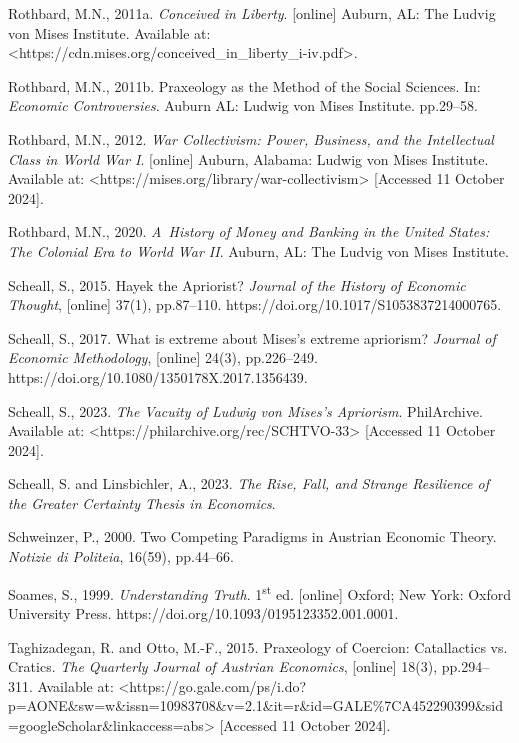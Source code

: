 Rothbard, M.N., 2011a. \textit{Conceived in Liberty}. [online] Auburn, AL: The Ludvig von Mises Institute. Available at: {\textless}https://cdn.mises.org/conceived\_in\_liberty\_i-iv.pdf{\textgreater}.



Rothbard, M.N., 2011b. Praxeology as the Method of the Social Sciences. In: \textit{Economic Controversies}. Auburn AL: Ludwig von Mises Institute. pp.29–58.



Rothbard, M.N., 2012. \textit{War Collectivism: Power, Business, and the Intellectual Class in World War I}. [online] Auburn, Alabama: Ludwig von Mises Institute. Available at: {\textless}https://mises.org/library/war-collectivism{\textgreater} [Accessed 11 October 2024].



Rothbard, M.N., 2020. \textit{A~History of Money and Banking in the United States: The Colonial Era to World War II}. Auburn, AL: The Ludvig von Mises Institute.



Scheall, S., 2015. Hayek the Apriorist? \textit{Journal of the History of Economic Thought}, [online] 37(1), pp.87–110. https://doi.org/10.1017/S1053837214000765.



Scheall, S., 2017. What is extreme about Mises's extreme apriorism? \textit{Journal of Economic Methodology}, [online] 24(3), pp.226–249. https://doi.org/10.1080/1350178X.2017.1356439.



Scheall, S., 2023. \textit{The Vacuity of Ludwig von Mises's Apriorism}. PhilArchive. Available at: {\textless}https://philarchive.org/rec/SCHTVO-33{\textgreater} [Accessed 11 October 2024].



Scheall, S. and Linsbichler, A., 2023. \textit{The Rise, Fall, and Strange Resilience of the Greater Certainty Thesis in Economics}.



Schweinzer, P., 2000. Two Competing Paradigms in Austrian Economic Theory. \textit{Notizie di Politeia}, 16(59), pp.44–66.



Soames, S., 1999. \textit{Understanding Truth}. 1\textsuperscript{st} ed. [online] Oxford; New York: Oxford University Press. https://doi.org/10.1093/0195123352.001.0001.



Taghizadegan, R. and Otto, M.-F., 2015. Praxeology of Coercion: Catallactics vs. Cratics. \textit{The Quarterly Journal of Austrian Economics}, [online] 18(3), pp.294–311. Available at: {\textless}https://go.gale.com/ps/i.do?p=AONE\&sw=w\&issn=10983708\&v=2.1\&it=r\&id=GALE\%7CA452290399\&sid=googleScholar\&linkaccess=abs{\textgreater} [Accessed 11 October 2024].



